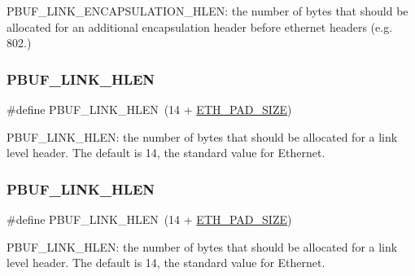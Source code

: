 P\+B\+U\+F\+\_\+\+L\+I\+N\+K\+\_\+\+E\+N\+C\+A\+P\+S\+U\+L\+A\+T\+I\+O\+N\+\_\+\+H\+L\+EN\+: the number of bytes that should be allocated for an additional encapsulation header before ethernet headers (e.\+g. 802.) \mbox{\label{group__lwip__opts__pbuf_ga35998a3d56af9940e6a80bb372597685}} 
\subsubsection{\texorpdfstring{P\+B\+U\+F\+\_\+\+L\+I\+N\+K\+\_\+\+H\+L\+EN}{PBUF\_LINK\_HLEN}\hspace{0.1cm}{\footnotesize\ttfamily [1/2]}}
{\footnotesize\ttfamily \#define P\+B\+U\+F\+\_\+\+L\+I\+N\+K\+\_\+\+H\+L\+EN~(14 + \hyperlink{group__lwip__opts__arp_gad7fa3b356ca7e603e848b069c4cc6276}{E\+T\+H\+\_\+\+P\+A\+D\+\_\+\+S\+I\+ZE})}

P\+B\+U\+F\+\_\+\+L\+I\+N\+K\+\_\+\+H\+L\+EN\+: the number of bytes that should be allocated for a link level header. The default is 14, the standard value for Ethernet. \mbox{\label{group__lwip__opts__pbuf_ga35998a3d56af9940e6a80bb372597685}} 
\subsubsection{\texorpdfstring{P\+B\+U\+F\+\_\+\+L\+I\+N\+K\+\_\+\+H\+L\+EN}{PBUF\_LINK\_HLEN}\hspace{0.1cm}{\footnotesize\ttfamily [2/2]}}
{\footnotesize\ttfamily \#define P\+B\+U\+F\+\_\+\+L\+I\+N\+K\+\_\+\+H\+L\+EN~(14 + \hyperlink{group__lwip__opts__arp_gad7fa3b356ca7e603e848b069c4cc6276}{E\+T\+H\+\_\+\+P\+A\+D\+\_\+\+S\+I\+ZE})}

P\+B\+U\+F\+\_\+\+L\+I\+N\+K\+\_\+\+H\+L\+EN\+: the number of bytes that should be allocated for a link level header. The default is 14, the standard value for Ethernet. \mbox{\label{group__lwip__opts__pbuf_gae61f4491d56e805e79b79eb5d35a00e5}} 

